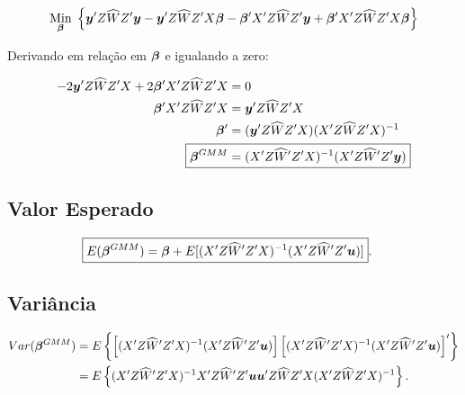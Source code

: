 \documentclass[11pt,oneside,a4paper]{article}
\numberwithin{equation}{section}
\begin{document}
\vspace{-1 em}
\begin{align*}
\underset{\boldsymbol{\beta}}{\text{Min}} \;
\left\{ 
\boldsymbol{y}' Z \widehat{W} Z' \boldsymbol{y}
-
\boldsymbol{y}' Z \widehat{W} Z' X \boldsymbol{\beta}
-
\boldsymbol{\beta}' X'  Z \widehat{W} Z' \boldsymbol{y}
+
\boldsymbol{\beta}' X'  Z \widehat{W} Z' X \boldsymbol{\beta}
\right\}
\end{align*}

Derivando em relação em $\boldsymbol{\beta}$ e igualando a zero:

\vspace{-1 em}
\begin{align*}
-2 \mbs{y}' Z \widehat{W} Z' X + 2 \mbs{\beta}'X' Z \widehat{W} Z' X &= 0
\\
\mbs{\beta}'X' Z \widehat{W} Z' X &= \mbs{y}' Z \widehat{W} Z' X 
\\
\mbs{\beta}' &= ( \mbs{y}' Z \widehat{W} Z' X ) ( X' Z \widehat{W} Z' X )^{-1}
\\
\Aboxed{
\mbs{\beta}^{GMM} &= ( X' Z \widehat{W}' Z' X )^{-1} ( X' Z \widehat{W}' Z' \mbs{y} ) }
\end{align*}

\subsection*{Valor Esperado} 

\vspace{-1 em}
\begin{align*}
\Aboxed{
E( \mbs{\beta}^{GMM} ) &=
\mbs{\beta} +
E[ ( X' Z \widehat{W}' Z' X )^{-1} ( X' Z \widehat{W}' Z' \mbs{u} ) ] }.
\end{align*}

\subsection*{Variância} 

\vspace{-1 em}
\begin{align*}
Var( \boldsymbol{\beta}^{GMM} ) &=
E \left\{ 
\left[ ( X' Z \widehat{W}' Z' X )^{-1} ( X' Z \widehat{W}' Z' \boldsymbol{u} ) \right]
\left[ ( X' Z \widehat{W}' Z' X )^{-1} ( X' Z \widehat{W}' Z' \boldsymbol{u} ) \right]'
\right\}
\\ &=
E \left\{ 
( X' Z \widehat{W}' Z' X )^{-1}
X' Z \widehat{W}' Z' \boldsymbol{u} \boldsymbol{u}' Z \widehat{W} Z' X 
( X' Z \widehat{W} Z' X )^{-1}
\right\}.
\end{align*}
\end{document}
